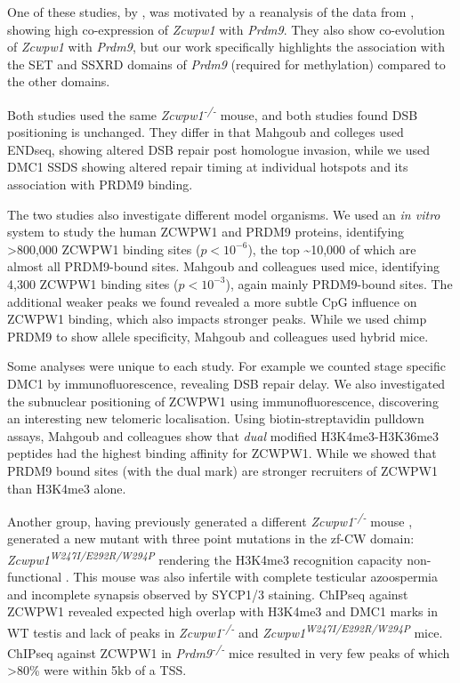 One of these studies, by \cite{Mahgoub2019Dual}, was motivated by a reanalysis of the data from \cite{Chen2018Singlecell}, showing high co-expression of \textit{Zcwpw1} with \textit{Prdm9}.
They also show co-evolution of \textit{Zcwpw1} with \textit{Prdm9}, but our work specifically highlights the association with the SET and SSXRD domains of \textit{Prdm9} (required for methylation) compared to the other domains.

Both studies used the same \textit{Zcwpw1\textsuperscript{-/-}} mouse, and both studies found DSB positioning is unchanged.
They differ in that Mahgoub and colleges used ENDseq, showing altered DSB repair post homologue invasion, while we used DMC1 SSDS showing altered repair timing at individual hotspots and its association with PRDM9 binding.

The two studies also investigate different model organisms.
We used an \textit{in vitro} system to study the human ZCWPW1 and PRDM9 proteins, identifying >800,000 ZCWPW1 binding sites ($p<10^{-6}$), the top \textasciitilde10,000 of which are almost all PRDM9-bound sites.
Mahgoub and colleagues used mice, identifying 4,300 ZCWPW1 binding sites ($p<10^{-3}$), again mainly PRDM9-bound sites.
The additional weaker peaks we found revealed a more subtle CpG influence on ZCWPW1 binding, which also impacts stronger peaks.
While we used chimp PRDM9 to show allele specificity, Mahgoub and colleagues used hybrid mice.

Some analyses were unique to each study.
For example we counted stage specific DMC1 by immunofluorescence, revealing DSB repair delay.
We also investigated the subnuclear positioning of ZCWPW1 using immunofluorescence, discovering an interesting new telomeric localisation.
Using biotin-streptavidin pulldown assays, Mahgoub and colleagues show that \emph{dual} modified H3K4me3-H3K36me3 peptides had the highest binding affinity for ZCWPW1.
While we showed that PRDM9 bound sites (with the dual mark) are stronger recruiters of ZCWPW1 than H3K4me3 alone.

Another group, having previously generated a different \textit{Zcwpw1\textsuperscript{-/-}} mouse \parencite{Li2019histone}, generated a new mutant with three point mutations in the zf-CW domain: \textit{Zcwpw1\textsuperscript{W247I/E292R/W294P}} rendering the H3K4me3 recognition capacity non-functional \parencite{Huang2019histone}.
This mouse was also infertile with complete testicular azoospermia and incomplete synapsis observed by SYCP1/3 staining.
ChIPseq against ZCWPW1 revealed expected high overlap with H3K4me3 and DMC1 marks in WT testis and lack of peaks in \textit{Zcwpw1\textsuperscript{-/-}} and \textit{Zcwpw1\textsuperscript{W247I/E292R/W294P}} mice.
ChIPseq against ZCWPW1 in \textit{Prdm9\textsuperscript{-/-}} mice resulted in very few peaks of which >80\% were within 5kb of a TSS.

